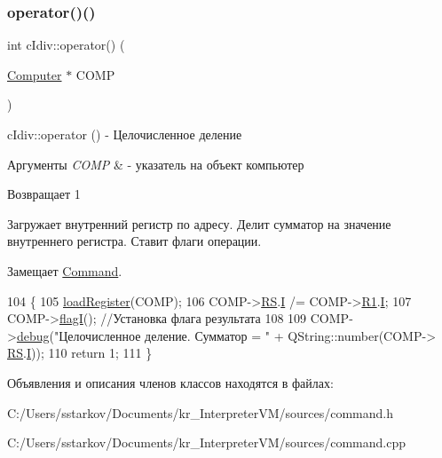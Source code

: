 \subsubsection{\texorpdfstring{operator()()}{operator()()}}
{\footnotesize\ttfamily int c\+Idiv\+::operator() (\begin{DoxyParamCaption}\item[{\hyperlink{class_computer}{Computer} $\ast$}]{C\+O\+MP }\end{DoxyParamCaption})\hspace{0.3cm}{\ttfamily [virtual]}}



c\+Idiv\+::operator () -\/ Целочисленное деление 


\begin{DoxyParams}{Аргументы}
{\em C\+O\+MP} & -\/ указатель на объект компьютер \\
\hline
\end{DoxyParams}
\begin{DoxyReturn}{Возвращает}
1
\end{DoxyReturn}
Загружает внутренний регистр по адресу. Делит сумматор на значение внутреннего регистра. Ставит флаги операции. 

Замещает \hyperlink{class_command_a79939b66f3de892e91d7710844294716}{Command}.


\begin{DoxyCode}
104 \{
105     \hyperlink{class_command_aac6f368e7c9dbb357b3f00627d5dabfc}{loadRegister}(COMP);
106     COMP->\hyperlink{class_computer_a874503110664b3cf821118d2ce9c2b96}{RS}.\hyperlink{union_computer_1_1data_a6e51de6e0351adc4e50b336a092bc4bb}{I} /= COMP->\hyperlink{class_computer_a0fbf84599b7db9d634a92afed443ee73}{R1}.\hyperlink{union_computer_1_1data_a6e51de6e0351adc4e50b336a092bc4bb}{I};
107     COMP->\hyperlink{class_computer_aae4a76a8a03a6c9fb1c12968d629be3e}{flagI}(); \textcolor{comment}{//Установка флага результата}
108 
109     COMP->\hyperlink{class_computer_a10ca6c6b200630119201de16d7368e0f}{debug}(\textcolor{stringliteral}{"Целочисленное деление. Сумматор = "} + QString::number(COMP->
      \hyperlink{class_computer_a874503110664b3cf821118d2ce9c2b96}{RS}.\hyperlink{union_computer_1_1data_a6e51de6e0351adc4e50b336a092bc4bb}{I}));
110     \textcolor{keywordflow}{return} 1;
111 \}
\end{DoxyCode}


Объявления и описания членов классов находятся в файлах\+:\begin{DoxyCompactItemize}
\item 
C\+:/\+Users/sstarkov/\+Documents/kr\+\_\+\+Interpreter\+V\+M/sources/command.\+h\item 
C\+:/\+Users/sstarkov/\+Documents/kr\+\_\+\+Interpreter\+V\+M/sources/command.\+cpp\end{DoxyCompactItemize}
